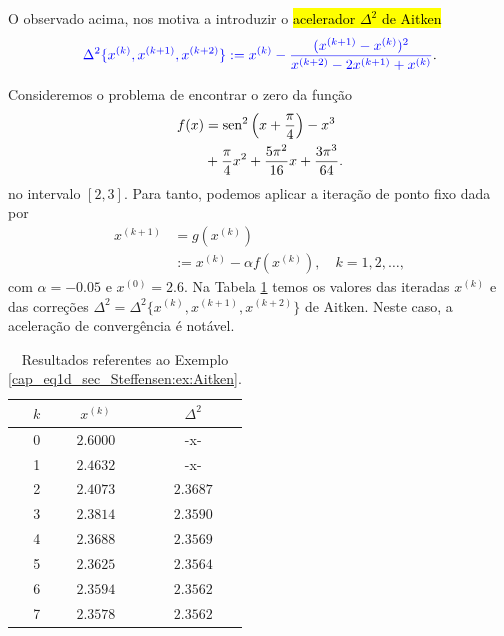 O observado acima, nos motiva a introduzir o \hl{acelerador $\Delta^2$ de Aitken}
\begin{equation}\label{cap_eq1d_sec_Steffensen:eq:ac_aitken}
  {\color{blue}\Delta^2\{x^{(k)},x^{(k+1)},x^{(k+2)}\} := x^{(k)} - \frac{(x^{(k+1)}-x^{(k)})^2}{x^{(k+2)}-2x^{(k+1)}+x^{(k)}}}.
\end{equation}


\begin{ex}\label{cap_eq1d_sec_Steffensen:ex:Aitken}
  Consideremos o problema de encontrar o zero da função
  \begin{equation}
    \begin{aligned}
      f(x) &= \operatorname{sen}^2\left(x+\frac{\pi}{4}\right) - x^3 \\
      &+ \frac{\pi}{4}x^2 + \frac{5\pi^2}{16}x + \frac{3\pi^3}{64}.
  \end{aligned}
  \end{equation}
  no intervalo $[2, 3]$. Para tanto, podemos aplicar a iteração de ponto fixo dada por
  \begin{equation}
    \begin{aligned}
      x^{(k+1)} &= g(x^{(k)}) \\
      &:= x^{(k)} - \alpha f(x^{(k)}),\quad k = 1, 2, \ldots,
  \end{aligned}
  \end{equation}
com $\alpha=-0.05$ e $x^{(0)}=2.6$. Na Tabela \ref{cap_eq1d_sec_Steffensen:tab:ex_Aitken} temos os valores das iteradas $x^{(k)}$ e das correções $\Delta^2 = \Delta^2\{x^{(k)},x^{(k+1)},x^{(k+2)}\}$ de Aitken. Neste caso, a aceleração de convergência é notável.

\begin{table}[H]
  \centering
  \caption{Resultados referentes ao Exemplo \ref{cap_eq1d_sec_Steffensen:ex:Aitken}.}
  \label{cap_eq1d_sec_Steffensen:tab:ex_Aitken}
  \begin{tabular}{r|cc}
    $k$ & $x^{(k)}$ & $\Delta^2$ \\\hline
    0 & $2.6000$ & -x- \\
    1 & $2.4632$ & -x- \\
    2 & $2.4073$ & $2.3687$ \\
    3 & $2.3814$ & $2.3590$ \\
    4 & $2.3688$ & $2.3569$ \\
    5 & $2.3625$ & $2.3564$ \\
    6 & $2.3594$ & $2.3562$ \\
    7 & $2.3578$ & $2.3562$ \\\hline
  \end{tabular}
\end{table}


\end{ex}
